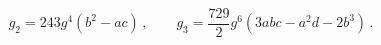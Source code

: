 \begin{equation}
g_2 = 243 g^4 (b^2 - ac)\,, \qquad g_3 = \frac{729}{2} g^6 (3abc - a^2 d - 2b^3)\,.
\end{equation}

